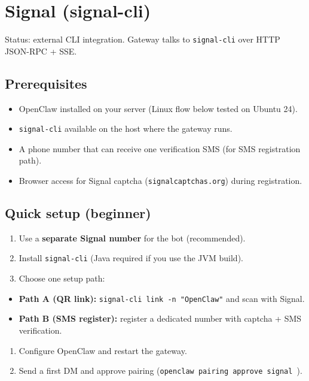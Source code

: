 \clearpage

\section{Signal (signal-cli)}


Status: external CLI integration. Gateway talks to \texttt{signal-cli} over HTTP JSON-RPC + SSE.

\subsection{Prerequisites}


\begin{itemize}
  \item OpenClaw installed on your server (Linux flow below tested on Ubuntu 24).
  \item \texttt{signal-cli} available on the host where the gateway runs.
  \item A phone number that can receive one verification SMS (for SMS registration path).
  \item Browser access for Signal captcha (\texttt{signalcaptchas.org}) during registration.
\end{itemize}


\subsection{Quick setup (beginner)}


\begin{enumerate}
  \item Use a \textbf{separate Signal number} for the bot (recommended).
  \item Install \texttt{signal-cli} (Java required if you use the JVM build).
  \item Choose one setup path:
\end{enumerate}

\begin{itemize}
  \item \textbf{Path A (QR link):} \texttt{signal-cli link -n "OpenClaw"} and scan with Signal.
  \item \textbf{Path B (SMS register):} register a dedicated number with captcha + SMS verification.
\end{itemize}

\begin{enumerate}
  \item Configure OpenClaw and restart the gateway.
  \item Send a first DM and approve pairing (\texttt{openclaw pairing approve signal }).
\end{enumerate}


